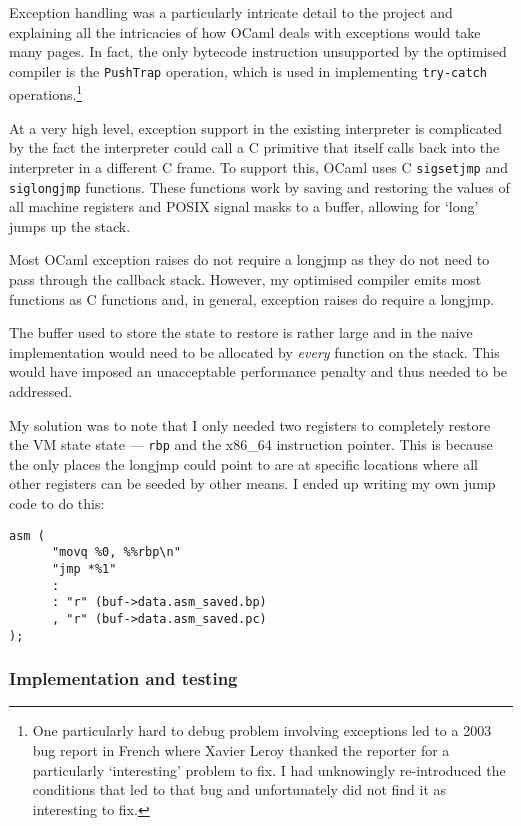 Exception handling was a particularly intricate detail to the project and explaining all the
intricacies of how OCaml deals with exceptions would take many pages. In fact, the only bytecode
instruction unsupported by the optimised compiler is the \texttt{PushTrap} operation, which is used
in implementing \texttt{try-catch} operations.\footnote{
      One particularly hard to debug problem involving exceptions led to a 2003 bug report in
      French where Xavier Leroy thanked the reporter for a particularly `interesting' problem to
      fix. I
      had unknowingly re-introduced the conditions that led to that bug and unfortunately did not
      find it
      as interesting to fix.}

At a very high level, exception support in the existing interpreter is complicated by the fact the
interpreter could call a C primitive that itself calls back into the interpreter in a different C
frame. To support this, OCaml uses C \texttt{sigsetjmp} and \texttt{siglongjmp} functions. These
functions work by saving and restoring the values of all machine registers and POSIX signal masks
to a buffer, allowing for `long' jumps up the stack.

Most OCaml exception raises do not require a longjmp as they do not need to pass through
the callback stack. However, my optimised compiler emits most functions as C functions and, in
general, exception raises do require a longjmp.

The buffer used to store the state to restore is rather large and in the naive implementation would
need to be allocated by \emph{every} function on the stack.  This would have imposed an
unacceptable
performance penalty and thus needed to be addressed.

My solution was to note that I only needed two registers to completely restore the VM state
state --- \texttt{rbp} and the x86\_64 instruction pointer. This is because the only places the
longjmp could point to are at specific locations where all other registers can be seeded by other
means. I ended up writing my own jump code to do this:

\begin{verbatim}
asm (
      "movq %0, %%rbp\n"
      "jmp *%1"
      :
      : "r" (buf->data.asm_saved.bp)
      , "r" (buf->data.asm_saved.pc)
);
\end{verbatim}

\subsubsection{Implementation and testing}

